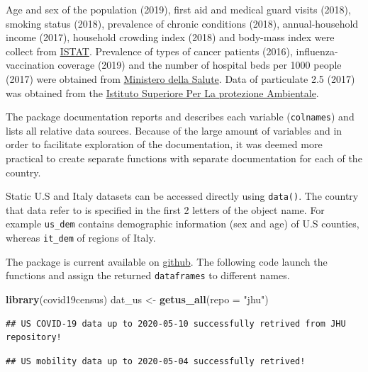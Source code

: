 \documentclass[12pt,halfline,a4paper,]{ouparticle}
\newenvironment{Shaded}{\begin{snugshade}}{\end{snugshade}}
\newcommand{\DataTypeTok}[1]{\textcolor[rgb]{0.13,0.29,0.53}{#1}}
\newcommand{\KeywordTok}[1]{\textcolor[rgb]{0.13,0.29,0.53}{\textbf{#1}}}
\newcommand{\NormalTok}[1]{#1}
\newcommand{\StringTok}[1]{\textcolor[rgb]{0.31,0.60,0.02}{#1}}
\begin{document}
Age and sex of the population (2019), first aid and medical guard visits
(2018), smoking status (2018), prevalence of chronic conditions (2018),
annual-household income (2017), household crowding index (2018) and
body-mass index were collect from
\href{http://dati.istat.it/?lang=en}{ISTAT}. Prevalence of types of
cancer patients (2016), influenza-vaccination coverage (2019) and the
number of hospital beds per 1000 people (2017) were obtained from
\href{http://www.dati.salute.gov.it/}{Ministero della Salute}. Data of
particulate 2.5 (2017) was obtained from the
\href{https://annuario.isprambiente.it/pon/basic/14}{Istituto Superiore
Per La protezione Ambientale}.

The package documentation reports and describes each variable
(\texttt{colnames}) and lists all relative data sources. Because of the
large amount of variables and in order to facilitate exploration of the
documentation, it was deemed more practical to create separate functions
with separate documentation for each of the country.

Static U.S and Italy datasets can be accessed directly using
\texttt{data()}. The country that data refer to is specified in the
first 2 letters of the object name. For example \texttt{us\_dem}
contains demographic information (sex and age) of U.S counties, whereas
\texttt{it\_dem} of regions of Italy.

The package is current available on
\href{https://github.com/c1au6i0/covid19census}{github}. The following
code launch the functions and assign the returned \texttt{dataframes} to
different names.

\bigskip

\begin{Shaded}
\begin{Highlighting}[]
\KeywordTok{library}\NormalTok{(covid19census)}
\NormalTok{dat_us <-}\StringTok{ }\KeywordTok{getus_all}\NormalTok{(}\DataTypeTok{repo =} \StringTok{"jhu"}\NormalTok{)}
\end{Highlighting}
\end{Shaded}

\begin{verbatim}
## US COVID-19 data up to 2020-05-10 successfully retrived from JHU repository!
\end{verbatim}

\begin{verbatim}
## US mobility data up to 2020-05-04 successfully retrived!
\end{verbatim}
\end{document}
